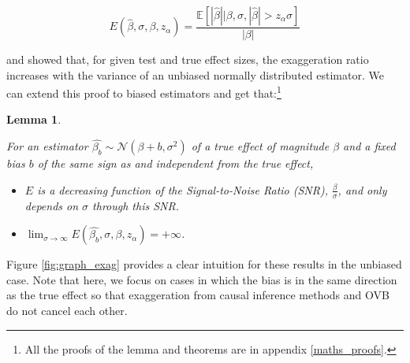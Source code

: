 \documentclass[usletter, 12pt]{article}
\newtheorem{lemma}{Lemma}
\begin{document}
		 
				 \begin{equation}\label{exagg_general}
				 	E(\hat{\beta}, \sigma, \beta, z_{\alpha}) =
					 	\dfrac{\mathbb{E}\left[ | \hat{\beta} | \big| \beta, \sigma, |\hat{\beta}| > z_{\alpha} \sigma \right]}{| \beta |} 
				\end{equation}
				
			\cite{lu_note_2019} and \cite{zwet_significance_2021} showed that, for given test and true effect sizes, the exaggeration ratio increases with the variance of an unbiased normally distributed estimator. We can extend this proof to biased estimators and get that:\footnote{All the proofs of the lemma and theorems are in appendix \ref{maths_proofs}.}\label{lemma_evol_exagg}
			
			\begin{lemma}
				\label{lemma_drivers}
			
				For an estimator $\hat{\beta_{b}}  \sim \mathcal{N}(\beta + b, \sigma^{2})$ of a true effect of magnitude $\beta$ and a fixed bias $b$ of the same sign as and independent from the true effect,
				
				\begin{itemize}
					\item $E$ is a decreasing function of the Signal-to-Noise Ratio (SNR), $\frac{\beta}{\sigma}$, and only depends on $\sigma$ through this SNR. 
					\item  $\lim_{\sigma\to \infty} E(\hat{\beta_{b}}, \sigma, \beta, z_{\alpha}) = +\infty$.
				\end{itemize}
			\end{lemma}
			
				Figure \ref{fig:graph_exag} provides a clear intuition for these results in the unbiased case. Note that here, we focus on cases in which the bias is in the same direction as the true effect so that exaggeration from causal inference methods and OVB do not cancel each other.\\
				 
\end{document}

